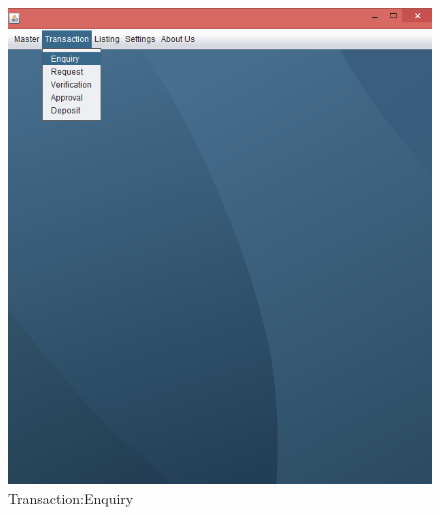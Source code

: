 \begin{figure}[ht]
\begin{center}
\includegraphics[scale=0.5]{images/image21.png}
\end{center}
\caption{Transaction:Enquiry}
\label{Transaction:Enquiry}
\end{figure}



